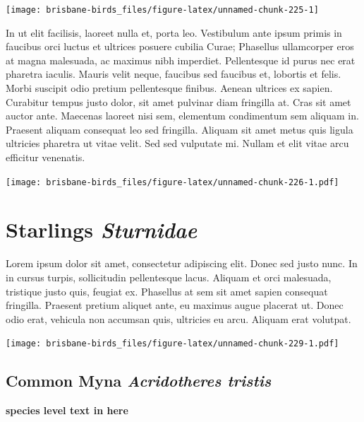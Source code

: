 \documentclass[]{book}
\let\origfigure\figure
\let\endorigfigure\endfigure
\renewenvironment{figure}[1][2] {
  \expandafter\origfigure\expandafter[H]
} {
  \endorigfigure
}
\begin{document}
\begin{figure}
\texttt{[image: brisbane-birds\_files/figure-latex/unnamed-chunk-225-1]} \caption{insert figure caption}\label{fig:unnamed-chunk-225}
\end{figure}

In ut elit facilisis, laoreet nulla et, porta leo. Vestibulum ante ipsum
primis in faucibus orci luctus et ultrices posuere cubilia Curae;
Phasellus ullamcorper eros at magna malesuada, ac maximus nibh
imperdiet. Pellentesque id purus nec erat pharetra iaculis. Mauris velit
neque, faucibus sed faucibus et, lobortis et felis. Morbi suscipit odio
pretium pellentesque finibus. Aenean ultrices ex sapien. Curabitur
tempus justo dolor, sit amet pulvinar diam fringilla at. Cras sit amet
auctor ante. Maecenas laoreet nisi sem, elementum condimentum sem
aliquam in. Praesent aliquam consequat leo sed fringilla. Aliquam sit
amet metus quis ligula ultricies pharetra ut vitae velit. Sed sed
vulputate mi. Nullam et elit vitae arcu efficitur venenatis.

\begin{figure}
\centering
\texttt{[image: brisbane-birds\_files/figure-latex/unnamed-chunk-226-1.pdf]}
\caption{\label{fig:unnamed-chunk-226}insert figure caption}
\end{figure}

\chapter{\texorpdfstring{Starlings
\emph{Sturnidae}}{Starlings Sturnidae}}\label{starlings-sturnidae}

Lorem ipsum dolor sit amet, consectetur adipiscing elit. Donec sed justo
nunc. In in cursus turpis, sollicitudin pellentesque lacus. Aliquam et
orci malesuada, tristique justo quis, feugiat ex. Phasellus at sem sit
amet sapien consequat fringilla. Praesent pretium aliquet ante, eu
maximus augue placerat ut. Donec odio erat, vehicula non accumsan quis,
ultricies eu arcu. Aliquam erat volutpat.

\texttt{[image: brisbane-birds\_files/figure-latex/unnamed-chunk-229-1.pdf]}

\section{\texorpdfstring{Common Myna \emph{Acridotheres
tristis}}{Common Myna Acridotheres tristis}}\label{common-myna-acridotheres-tristis}

\textbf{species level text in here}
\end{document}
